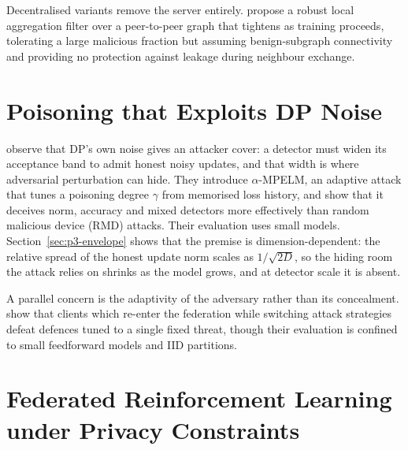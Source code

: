 \vspace{10pt}

Decentralised variants remove the server entirely.
\citeauthor{FangByzantineDecentralizedFL}
\cite{FangByzantineDecentralizedFL} propose a robust local aggregation filter
over a peer-to-peer graph that tightens as training proceeds, tolerating a large
malicious fraction but assuming benign-subgraph connectivity and providing no
protection against leakage during neighbour exchange.

\section{Poisoning that Exploits DP Noise}

\citeauthor{HossainDynamicDifferentialPoisoning}
\cite{HossainDynamicDifferentialPoisoning} observe that DP's own noise gives an
attacker cover: a detector must widen its acceptance band to admit honest noisy
updates, and that width is where adversarial perturbation can hide. They
introduce $\alpha$-MPELM, an adaptive attack that tunes a poisoning degree
$\gamma$ from memorised loss history, and show that it deceives norm, accuracy
and mixed detectors more effectively than random malicious device (RMD) attacks.
Their evaluation uses small models. Section~\ref{sec:p3-envelope} shows that the
premise is dimension-dependent: the relative spread of the honest update norm
scales as $1/\sqrt{2D}$, so the hiding room the attack relies on shrinks as the
model grows, and at detector scale it is absent.

\vspace{10pt}

A parallel concern is the adaptivity of the adversary rather than its
concealment. \citeauthor{SzelagaAdaptiveAdversariesSurvey}
\cite{SzelagaAdaptiveAdversariesSurvey} show that clients which re-enter the
federation while switching attack strategies defeat defences tuned to a single
fixed threat, though their evaluation is confined to small feedforward models
and IID partitions.

\section{Federated Reinforcement Learning under Privacy Constraints}

